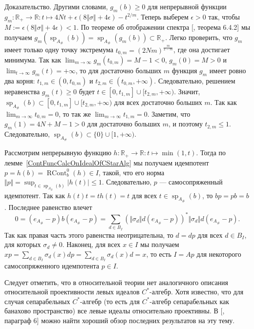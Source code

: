 \documentclass[12pt]{article}
\numberwithin{equation}{subsection}
\theoremstyle{plain}
\newenvironment{proof}{Доказательство.}{}
\begin{document}
\begin{fulltext}
\begin{proof}
Другими словами, $g_m(b)\geq 0$ для непрерывной функции
$g_m:\mathbb{R}_+\to\mathbb{R}:t\mapsto
4Nt+\epsilon(8\Vert\sigma\Vert+4\epsilon)-t^{2/m}$. Теперь выберем $\epsilon>0$
так, чтобы $M:=\epsilon(8\Vert\sigma\Vert+4\epsilon)<1$. По теореме об
отображении спектра [\cite{HelLectAndExOnFuncAn}, теорема 6.4.2] мы получаем
$g_m(\operatorname{sp}_{A_\#}(b))
=\operatorname{sp}_{A_\#}(g_m(b))\subset\mathbb{R}_+$.
Легко проверить, что $g_m$ имеет только одну точку экстремума
$t_{0,m}={(2Nm)}^{\frac{m}{2-m}}$, где она достигает минимума. Так как
$\lim_{m\to\infty} g_m(t_{0,m})=M-1<0$, $g_m(0)=M>0$ и $\lim_{t\to\infty}
g_m(t)=+\infty$, то для достаточно больших $m$ функция $g_m$ имеет ровно два
корня: $t_{1,m}\in(0,t_{0,m})$ и $t_{2,m}\in(t_{0,m},+\infty)$. Следовательно,
решением неравенства $g_m(t)\geq 0$ будет
$t\in[0,t_{1,m}]\cup[t_{2,m},+\infty)$. Значит,  %
$\operatorname{sp}_{A_\#}(b)
\subset[0,t_{1,m}]\cup[t_{2,m},+\infty)$  %
для всех достаточно больших $m$. Так как $\lim_{m\to\infty} t_{0,m}=0$, 
то так же $\lim_{m\to\infty} t_{1,m}=0$. Заметим, что $g_m(1)=4N+M-1>0$ для
достаточно больших $m$, и поэтому $t_{2,m}\leq 1$. Следовательно,
$\operatorname{sp}_{A_\#}(b)\subset \{0 \}\cup[1,+\infty)$.  %

Рассмотрим непрерывную функцию $h:\mathbb{R}_+\to\mathbb{R}:t\mapsto\min(1, t)$.
Тогда по лемме~\ref{ContFuncCalcOnIdealOfCStarAlg} мы получаем идемпотент
$p=h(b)=\operatorname{RCont}_b^0(h)\in I$, такой, что его норма $\Vert
p\Vert=\sup_{t\in\operatorname{sp}_{A_\#}(b)}|h(t)|\leq 1$. Следовательно, $p$
--- самосопряженный идемпотент. Так как $h(t)t=th(t)=t$ для всех $t\in
\operatorname{sp}_{A_\#}(b)$, то $bp=pb=b$. Последнее равенство влечет
$$
0=(e_{A_\#}-p)b(e_{A_\#}-p
)=\sum_{d\in B_I}
    {(\Vert\sigma_d\Vert d(e_{A_\#}-p))}^*\Vert\sigma_d\Vert d(e_{A_\#}-p).
$$
Так как правая часть этого равенства неотрицательна, то $d=dp$ для всех $d\in
B_I$, для которых $\sigma_d\neq 0$. Наконец, для всех $x\in I$ мы получаем
$xp=\sum_{d\in B_I}\sigma_d(x)dp=\sum_{d\in B_I}\sigma_d(x)d=x$, то есть $I=Ap$
для некоторого самосопряженного идемпотента $p\in I$.
\end{proof}

Следует отметить, что в относительной теории нет аналогичного описания
относительной проективности левых идеалов $C^*$-алгебр. Хотя известно, что для
случая сепарабельных $C^*$-алгебр (то есть для $C^*$-алгебр сепарабельных как
банахово пространство) все левые идеалы относительно проективны. В
[\cite{LykProjOfBanAndCStarAlgsOfContFld}, параграф 6] можно найти хороший обзор
последних результатов на эту тему.


\end{fulltext}
\end{document}
